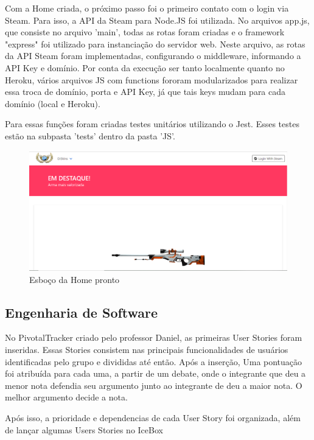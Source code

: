 Com a Home criada, o próximo passo foi o primeiro contato com o login via Steam. Para isso, a API
da Steam para Node.JS foi utilizada. No arquivos app.js, que consiste no arquivo 'main', todas as rotas foram criadas
e o framework "express" foi utilizado para instanciação do servidor web. Neste arquivo, as rotas da API Steam foram implementadas, configurando
o middleware, informando a API Key e domínio. Por conta da execução ser tanto localmente quanto no Heroku, 
vários arquivos JS com functions fororam modularizados para realizar essa troca de domínio, porta e API Key, já que tais keys mudam para cada domínio (local e Heroku). 

Para essas funções foram criadas testes unitários utilizando o Jest. Esses testes estão na subpasta 'tests' 
dentro da pasta 'JS'.\\

\begin{figure}[!htb]
	\centering
	\includegraphics[scale=0.5]{Imagens/Home.png}
	\caption{Esboço da Home pronto}
\end{figure}

\subsection{Engenharia de Software}
No PivotalTracker criado pelo professor Daniel, as primeiras User Stories foram inseridas. Essas Stories consistem 
nas principais funcionalidades de usuários identificadas pelo grupo e divididas até então. Após a inserção, 
Uma pontuação foi atribuída para cada uma, a partir de um debate, onde o integrante que deu a menor nota defendia seu argumento 
junto ao integrante de deu a maior nota. O melhor argumento decide a nota.

Após isso, a prioridade e dependencias de cada User Story foi organizada, além de lançar algumas Users Stories no IceBox\\

